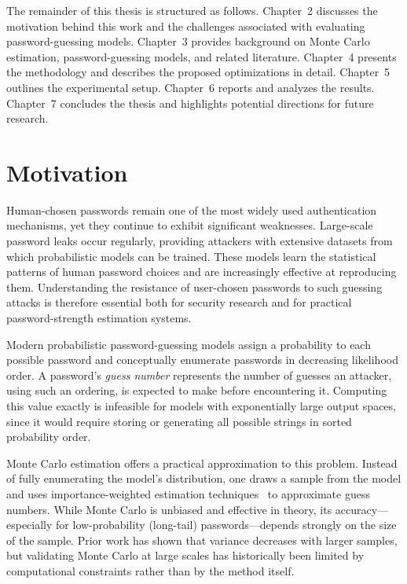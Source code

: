 \documentclass[english,noexaminfo,a4paper,oneside, binding = 0.6cm]{sapthesis}
\begin{document}
The remainder of this thesis is structured as follows. Chapter~2 discusses the motivation behind this work and the challenges associated with evaluating password-guessing models. Chapter~3 provides background on Monte Carlo estimation, password-guessing models, and related literature. Chapter~4 presents the methodology and describes the proposed optimizations in detail. Chapter~5 outlines the experimental setup. Chapter~6 reports and analyzes the results. Chapter~7 concludes the thesis and highlights potential directions for future research.


\chapter{Motivation}
\label{chap:2}

Human-chosen passwords remain one of the most widely used authentication mechanisms, yet they continue to exhibit significant weaknesses. Large-scale password leaks occur regularly, providing attackers with extensive datasets from which probabilistic models can be trained. These models learn the statistical patterns of human password choices and are increasingly effective at reproducing them. Understanding the resistance of user-chosen passwords to such guessing attacks is therefore essential both for security research and for practical password-strength estimation systems.

Modern probabilistic password-guessing models assign a probability to each possible password and conceptually enumerate passwords in decreasing likelihood order. A password's \textit{guess number} represents the number of guesses an attacker, using such an ordering, is expected to make before encountering it. Computing this value exactly is infeasible for models with exponentially large output spaces, since it would require storing or generating all possible strings in sorted probability order.

Monte Carlo estimation offers a practical approximation to this problem. Instead of fully enumerating the model’s distribution, one draws a sample from the model and uses importance-weighted estimation techniques~\cite{ref:dellamico} to approximate guess numbers. While Monte Carlo is unbiased and effective in theory, its accuracy—especially for low-probability (long-tail) passwords—depends strongly on the size of the sample. Prior work has shown that variance decreases with larger samples, but validating Monte Carlo at large scales has historically been limited by computational constraints rather than by the method itself.
\end{document}
